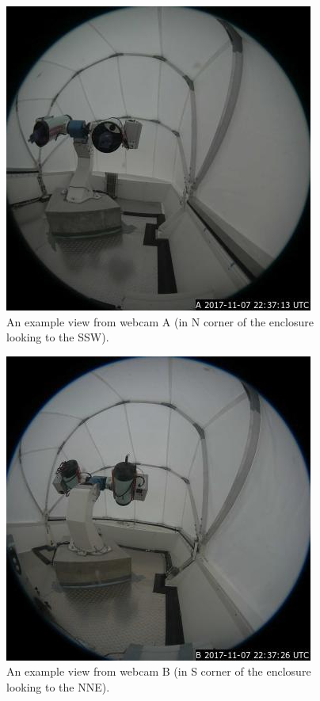 \begin{figure}
\begin{center}
\includegraphics[width=0.8\linewidth]{figures/interface-ddotioan-webcam-a.jpg}
\end{center}
\caption{An example view from webcam A (in N corner of the enclosure looking to the SSW).}
\label{figure:interface-webcam-a}
\end{figure}

\begin{figure}
\begin{center}
\includegraphics[width=0.8\linewidth]{figures/interface-ddotioan-webcam-b.jpg}
\end{center}
\caption{An example view from webcam B (in S corner of the enclosure looking to the NNE).}
\label{figure:interface-webcam-b}
\end{figure}

